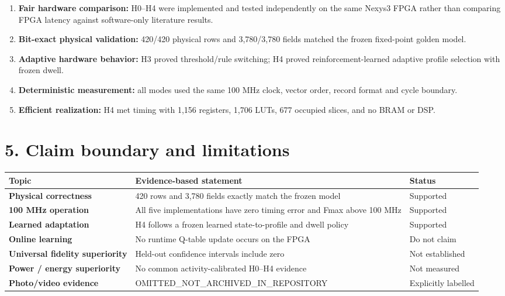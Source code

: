 \documentclass[10pt,a4paper]{article}
\begin{document}
\begin{enumerate}[leftmargin=1.5em]
\item \textbf{Fair hardware comparison:} H0--H4 were implemented and
      tested independently on the same Nexys3 FPGA rather than comparing
      FPGA latency against software-only literature results.
\item \textbf{Bit-exact physical validation:} 420/420 physical rows and
      3,780/3,780 fields matched the frozen fixed-point golden model.
\item \textbf{Adaptive hardware behavior:} H3 proved threshold/rule
      switching; H4 proved reinforcement-learned adaptive profile
      selection with frozen dwell.
\item \textbf{Deterministic measurement:} all modes used the same
      100 MHz clock, vector order, record format and cycle boundary.
\item \textbf{Efficient realization:} H4 met timing with 1,156
      registers, 1,706 LUTs, 677 occupied slices, and no BRAM or DSP.
\end{enumerate}

\section*{5. Claim boundary and limitations}

\begin{table}[H]
\centering
\small
\begin{tabularx}{\textwidth}{>{\bfseries}p{4.2cm}X p{3.2cm}}
\toprule
Topic & Evidence-based statement & Status \\
\midrule
Physical correctness & 420 rows and 3,780 fields exactly match the frozen model & Supported \\
100 MHz operation & All five implementations have zero timing error and Fmax above 100 MHz & Supported \\
Learned adaptation & H4 follows a frozen learned state-to-profile and dwell policy & Supported \\
Online learning & No runtime Q-table update occurs on the FPGA & Do not claim \\
Universal fidelity superiority & Held-out confidence intervals include zero & Not established \\
Power / energy superiority & No common activity-calibrated H0--H4 evidence & Not measured \\
Photo/video evidence & OMITTED\_NOT\_ARCHIVED\_IN\_REPOSITORY & Explicitly labelled \\
\bottomrule
\end{tabularx}
\end{table}
\end{document}
